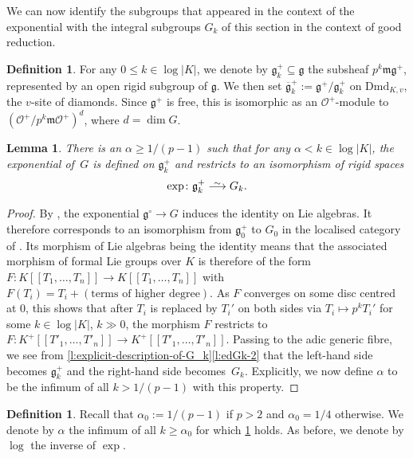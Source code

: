 \documentclass[11pt]{amsart}
\numberwithin{equation}{section}
\newtheorem{Lemma}[thm]{Lemma}
\theoremstyle{definition}
\newtheorem{Definition}[thm]{Definition}
\theoremstyle{remark}
\newcommand{\lra}{\longrightarrow}
\newcommand*{\lowsim}{\vbox to 0pt{\vss\hbox{$\scriptstyle\sim$}\vskip-2pt}}
\newcommand*{\longisomarrow}{\stackrel{\lowsim}{\lra}}
\renewcommand{\O}{\mathcal{O}}
\newcommand{\m}{\mathfrak{m}}
\newcommand{\mg}{\mathfrak{g}}
\newcommand{\Dmd}{\mathrm{Dmd}}
\begin{document}
We can now identify  the subgroups that appeared in the context of the exponential with the integral subgroups $G_k$ of this section in the context of good reduction. 

\begin{Definition}\label{d:mg-plus_k}
	For any $0\leq k \in \log|K|$,
	we denote by $\mathfrak g_k^+\subseteq \mg$ the subsheaf $p^{k}\m \mg^+$, represented by an open rigid subgroup of $\mathfrak g$. We then set $\overline{\mg}^+_k:=\mg^+/\mg^{+}_k$ on $\Dmd_{K,v}$, the $v$-site of diamonds. Since $\mg^+$ is free, this is isomorphic as an $\O^+$-module to $(\O^+/p^{k}\m\O^+)^d$, where $d=\dim G$.
\end{Definition}

\begin{Lemma}\label{l:exp-vs-integral-subgroups}
	There is an $\alpha\geq 1/(p-1)$ such that for any $\alpha<k\in \log|K|$, the exponential of\, $G$ is defined on $\mg^+_k$ and restricts to an isomorphism of rigid spaces
	\[ \exp\colon\mg^+_k \longisomarrow G_k.\]
\end{Lemma}

\begin{proof}
	By ,  the exponential $\mg^\circ\to G$ induces the identity on Lie algebras. It therefore corresponds to an isomorphism from $\mg^+_0$ to $G_0$ in the localised category of 
	.
	Its morphism of Lie algebras being the identity means that the associated morphism of formal Lie groups over $K$ is therefore of the form $F\colon K[[T_1,\dots,T_n]]\to K[[T_1,\dots,T_n]]$ with $F(T_i)=T_i+ (\text{terms of higher degree})$. As $F$ converges on some disc centred at $0$, this shows that after $T_i$ is replaced by $T_i'$ on both sides via $T_i\mapsto p^{k}T_i'$ for some $k\in \log|K|$, $k\gg 0$, the morphism $F$ restricts to $F\colon K^+[[T'_1,\dots,T'_n]]\to K^+[[T'_1,\dots,T'_n]]$. Passing to the adic generic fibre, we see from  \cref{l:explicit-description-of-G_k}\eqref{l:edGk-2} that the left-hand side becomes $\mg^+_k$ and the right-hand side becomes~$G_k$. Explicitly, we now define $\alpha$ to be the infimum of all $k>1/(p-1)$ with this property.
\end{proof}

\begin{Definition}
	Recall that  $\alpha_0:=1/(p-1)$ if $p>2$ and $\alpha_0=1/4$ otherwise.
	We denote by $\alpha$ the infimum of all $k\geq \alpha_0$ for which  \cref{l:exp-vs-integral-subgroups} holds. As before, we denote by $\log$ the inverse of $\exp$.
\end{Definition}
\end{document}
